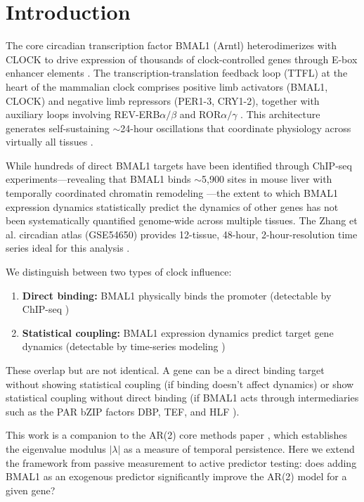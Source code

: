 \documentclass[11pt,letterpaper]{article}
\begin{document}
\section{Introduction}

The core circadian transcription factor BMAL1 (Arntl) heterodimerizes with CLOCK to drive expression of thousands of clock-controlled genes through E-box enhancer elements \citep{takahashi2017transcriptional, gekakis1998role}. The transcription-translation feedback loop (TTFL) at the heart of the mammalian clock comprises positive limb activators (BMAL1, CLOCK) and negative limb repressors (PER1-3, CRY1-2), together with auxiliary loops involving REV-ERB$\alpha/\beta$ and ROR$\alpha/\gamma$ \citep{ko2006molecular, reppert2002coordination}. This architecture generates self-sustaining $\sim$24-hour oscillations that coordinate physiology across virtually all tissues \citep{panda2002coordinated, storch2002extensive}.

While hundreds of direct BMAL1 targets have been identified through ChIP-seq experiments---revealing that BMAL1 binds $\sim$5,900 sites in mouse liver with temporally coordinated chromatin remodeling \citep{koike2012transcriptional}---the extent to which BMAL1 expression dynamics statistically predict the dynamics of other genes has not been systematically quantified genome-wide across multiple tissues. The Zhang et al. circadian atlas (GSE54650) provides 12-tissue, 48-hour, 2-hour-resolution time series ideal for this analysis \citep{zhang2014circadian}.

We distinguish between two types of clock influence:
\begin{enumerate}
\item \textbf{Direct binding:} BMAL1 physically binds the promoter (detectable by ChIP-seq \citep{koike2012transcriptional})
\item \textbf{Statistical coupling:} BMAL1 expression dynamics predict target gene dynamics (detectable by time-series modeling \citep{hamilton1994time, box2015time})
\end{enumerate}

These overlap but are not identical. A gene can be a direct binding target without showing statistical coupling (if binding doesn't affect dynamics) or show statistical coupling without direct binding (if BMAL1 acts through intermediaries such as the PAR bZIP factors DBP, TEF, and HLF \citep{gachon2006parbzip}).

This work is a companion to the AR(2) core methods paper \citep{whiteside2026par2a}, which establishes the eigenvalue modulus $|\lambda|$ as a measure of temporal persistence. Here we extend the framework from passive measurement to active predictor testing: does adding BMAL1 as an exogenous predictor significantly improve the AR(2) model for a given gene?
\end{document}
